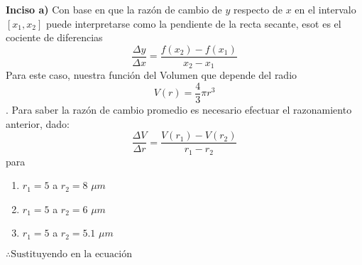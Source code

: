 \textbf{Inciso a)} Con base en que la razón de cambio de $y$ respecto de $x$ en el intervalo $[x_1,  x_2]$ puede interpretarse como la pendiente de la recta secante, esot es el cociente de diferencias $$\frac{\Delta y}{\Delta x}=\frac{f(x_2)-f(x_1)}{x_2-x_1}$$
Para este caso, nuestra función del Volumen que depende del radio $$V(r)=\frac{4}{3}\pi r^3$$. Para saber la razón de cambio promedio es necesario efectuar el razonamiento anterior, dado:$$\frac{\Delta V}{\Delta r}=\frac{V(r_1)-V(r_2)}{r_1-r_2}$$
para
\begin{multicols}{6}
	\noindent
	\begin{enumerate}[label=\roman*)]
		\item $r_1=5$ a $r_2=8$ $\mu m$
		      \columnbreak
		\item $r_1=5$ a $r_2=6$ $\mu m$
		      \columnbreak
		\item $r_1=5$ a $r_2=5.1$ $\mu m$
	\end{enumerate}
\end{multicols}
$\therefore \text{Sustituyendo en la ecuación}$
